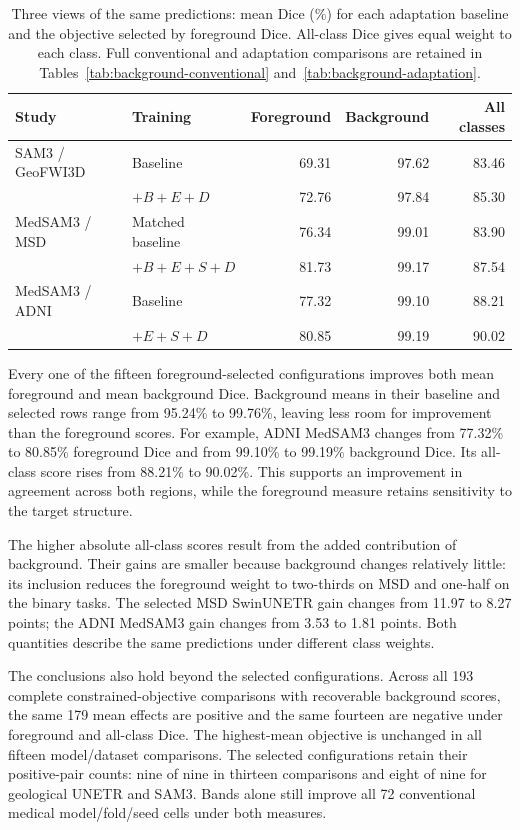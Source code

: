 \documentclass[12pt,a4paper]{article}
\begin{document}
\begin{table}[htbp]
\centering\small{}
\begin{tabular}{@{}llrrr@{}}
\hline
Study & Training & Foreground & Background & All classes \\
\hline
SAM3 / GeoFWI3D & Baseline & 69.31 & 97.62 & 83.46 \\
 & $+B+E+D$ & 72.76 & 97.84 & 85.30 \\
MedSAM3 / MSD & Matched baseline & 76.34 & 99.01 & 83.90 \\
 & $+B+E+S+D$ & 81.73 & 99.17 & 87.54 \\
MedSAM3 / ADNI & Baseline & 77.32 & 99.10 & 88.21 \\
 & $+E+S+D$ & 80.85 & 99.19 & 90.02 \\
\hline
\end{tabular}
\caption{Three views of the same predictions: mean Dice (\%) for each
adaptation baseline and the objective selected by foreground Dice.
All-class Dice gives equal weight to each class. Full conventional and
adaptation comparisons are retained in Tables~\ref{tab:background-conventional}
and~\ref{tab:background-adaptation}.}
\label{tab:dice-three-measures-summary}
\end{table}

Every one of the fifteen foreground-selected configurations improves both
mean foreground and mean background Dice. Background means in their
baseline and selected rows range from 95.24\% to 99.76\%, leaving
less room for improvement than the foreground scores. For example,
ADNI MedSAM3 changes from 77.32\% to 80.85\% foreground Dice and
from 99.10\% to 99.19\% background Dice. Its all-class score rises
from 88.21\% to 90.02\%. This supports an improvement in agreement
across both regions, while the foreground measure retains sensitivity
to the target structure.

The higher absolute all-class scores result from the added contribution
of background. Their gains are smaller because background changes
relatively little: its inclusion reduces the foreground weight to
two-thirds on MSD and one-half on the binary tasks. The selected
MSD SwinUNETR gain changes from 11.97 to 8.27 points; the ADNI
MedSAM3 gain changes from 3.53 to 1.81 points. Both quantities describe
the same predictions under different class weights.

The conclusions also hold beyond the selected configurations. Across
all 193 complete constrained-objective comparisons with recoverable
background scores, the same 179 mean effects are positive and the
same fourteen are negative under foreground and all-class Dice.
The highest-mean objective is unchanged in all fifteen model/dataset
comparisons. The selected configurations retain their positive-pair
counts: nine of nine in thirteen comparisons and eight of nine for
geological UNETR and SAM3. Bands alone still improve all 72 conventional medical
model/fold/seed cells under both measures.
\end{document}
